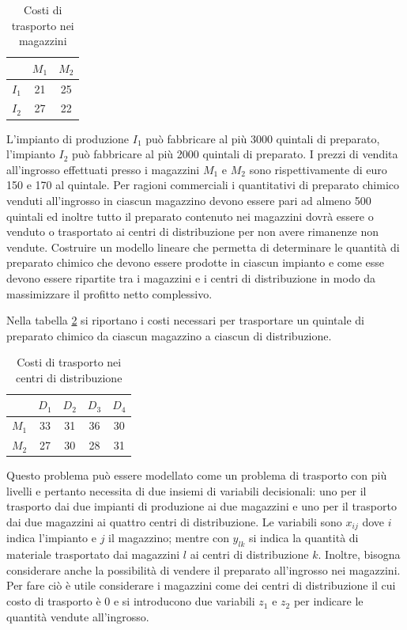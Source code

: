 \documentclass{article}
\begin{document}
\begin{table}
  \centering
  \begin{tabular}{|c|c|c|}
    \hline
    & $M_1$ & $M_2$ \\ 
    \hline 
    $I_1$ & 21 & 25 \\
    $I_2$ & 27 & 22 \\
    \hline
  \end{tabular}
  \caption{Costi di trasporto nei magazzini}
  \label{tab:costi_trasporto_magazzini}
\end{table}

L’impianto di produzione $I_1$ può fabbricare al più 3000 quintali di preparato,
l’impianto $I_2$ può fabbricare al più 2000 quintali di preparato.
I prezzi di vendita all’ingrosso effettuati presso i magazzini $M_1$ e $M_2$ sono
rispettivamente di euro 150 e 170 al quintale. Per ragioni commerciali i 
quantitativi di preparato chimico venduti all’ingrosso in ciascun magazzino
devono essere pari ad almeno 500 quintali ed inoltre tutto il preparato
contenuto nei magazzini dovrà essere o venduto o trasportato ai centri di 
distribuzione per non avere rimanenze non vendute. Costruire un modello lineare
che permetta di determinare le quantità di preparato chimico che devono essere
prodotte in ciascun impianto e come esse devono essere ripartite tra i magazzini
e i centri di distribuzione in modo da massimizzare il profitto netto complessivo.

Nella tabella \ref{tab:costi_trasporto_centri} si riportano i costi necessari
per trasportare un quintale di preparato chimico da ciascun magazzino a ciascun 
di distribuzione.\\

\begin{table}
  \centering
  \begin{tabular}{|c|c|c|c|c|}
    \hline
    & $D_1$ & $D_2$ & $D_3$ & $D_4$\\ 
    \hline 
    $M_1$ & 33 & 31 & 36 & 30 \\
    $M_2$ & 27 & 30 & 28 & 31 \\
    \hline
  \end{tabular}
  \caption{Costi di trasporto nei centri di distribuzione}
  \label{tab:costi_trasporto_centri}
\end{table}

Questo problema può essere modellato come un problema di trasporto con più 
livelli e pertanto necessita di due insiemi di variabili decisionali: uno per 
il trasporto dai due impianti di produzione ai due magazzini e uno per il 
trasporto dai due magazzini ai quattro centri di distribuzione. Le variabili 
sono $x_{ij}$ dove $i$ indica l'impianto e $j$ il magazzino; mentre con $y_{lk}$
si indica la quantità di materiale trasportato dai magazzini $l$ ai centri di 
distribuzione $k$. Inoltre, bisogna considerare anche la possibilità di vendere 
il preparato all'ingrosso nei magazzini. Per fare ciò è utile considerare i 
magazzini come dei centri di distribuzione il cui costo di trasporto è $0$ e 
si introducono due variabili $z_1$ e $z_2$ per indicare le quantità vendute 
all'ingrosso.
\end{document}
